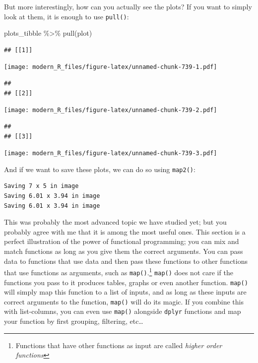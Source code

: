 \documentclass[
]{article}
\newenvironment{Shaded}{\begin{snugshade}}{\end{snugshade}}
\newcommand{\FunctionTok}[1]{\textcolor[rgb]{0.00,0.00,0.00}{#1}}
\newcommand{\NormalTok}[1]{#1}
\newcommand{\SpecialCharTok}[1]{\textcolor[rgb]{0.00,0.00,0.00}{#1}}
\newcommand{\StringTok}[1]{\textcolor[rgb]{0.31,0.60,0.02}{#1}}
\begin{document}
But more interestingly, how can you actually see the plots? If you want to simply look at them, it
is enough to use \texttt{pull()}:

\begin{Shaded}
\begin{Highlighting}[]
\NormalTok{plots\_tibble }\SpecialCharTok{\%\textgreater{}\%}
  \FunctionTok{pull}\NormalTok{(plot)}
\end{Highlighting}
\end{Shaded}

\begin{verbatim}
## [[1]]
\end{verbatim}

\texttt{[image: modern\_R\_files/figure-latex/unnamed-chunk-739-1.pdf]}

\begin{verbatim}
## 
## [[2]]
\end{verbatim}

\texttt{[image: modern\_R\_files/figure-latex/unnamed-chunk-739-2.pdf]}

\begin{verbatim}
## 
## [[3]]
\end{verbatim}

\texttt{[image: modern\_R\_files/figure-latex/unnamed-chunk-739-3.pdf]}

And if we want to save these plots, we can do so using \texttt{map2()}:

\begin{Shaded}
\end{Shaded}

\begin{verbatim}
Saving 7 x 5 in image
Saving 6.01 x 3.94 in image
Saving 6.01 x 3.94 in image
\end{verbatim}

This was probably the most advanced topic we have studied yet; but you probably agree with me that
it is among the most useful ones. This section is a perfect illustration of the power of functional
programming; you can mix and match functions as long as you give them the correct arguments.
You can pass data to functions that use data and then pass these functions to other functions that
use functions as arguments, such as \texttt{map()}.\footnote{Functions that have other functions as input are
  called \emph{higher order functions}} \texttt{map()} does not care if the functions you pass to it produces tables,
graphs or even another function. \texttt{map()} will simply map this function to a list of inputs, and as
long as these inputs are correct arguments to the function, \texttt{map()} will do its magic. If you
combine this with list-columns, you can even use \texttt{map()} alongside \texttt{dplyr} functions and map your
function by first grouping, filtering, etc\ldots{}
\end{document}
